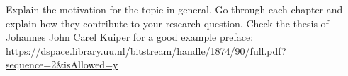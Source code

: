 
\begin{preface}
    \addchaptertocentry{\prefacename} %
    Explain the motivation for the topic in general. Go through each chapter and explain how they contribute to your research question.
    Check the thesis of Johannes John Carel Kuiper for a good example preface: \url{https://dspace.library.uu.nl/bitstream/handle/1874/90/full.pdf?sequence=2&isAllowed=y}
\end{preface}

